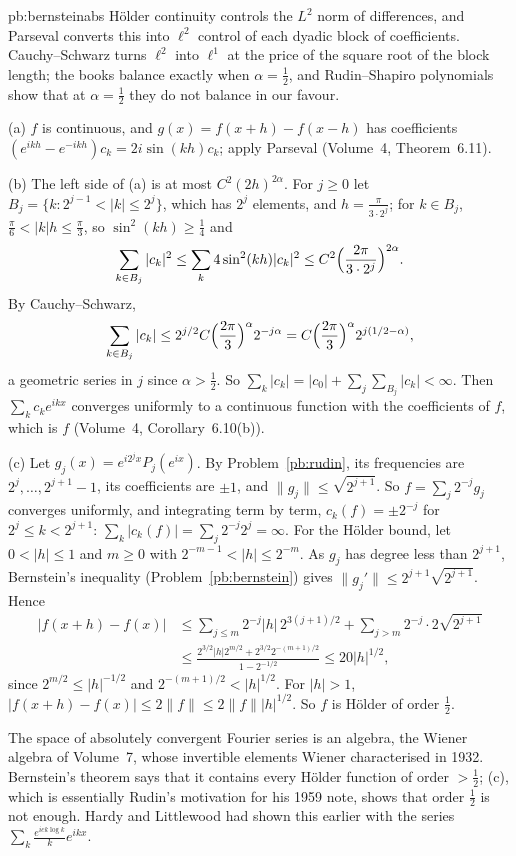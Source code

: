 \begin{solution}{pb:bernsteinabs}
\idea Hölder continuity controls the $L^2$ norm of differences, and Parseval converts this into $\ell^2$ control of each dyadic block of
coefficients. Cauchy--Schwarz turns $\ell^2$ into $\ell^1$ at the price of the square root of the block length; the books balance exactly
when $\alpha=\frac12$, and Rudin--Shapiro polynomials show that at $\alpha=\frac12$ they do not balance in our favour.

\writeup (a) $f$ is continuous, and $g(x)=f(x+h)-f(x-h)$ has coefficients $(e^{ikh}-e^{-ikh})c_k=2i\sin(kh)c_k$; apply Parseval (Volume~4, Theorem~6.11).

(b) The left side of (a) is at most $C^2(2h)^{2\alpha}$. For $j\ge0$ let $B_j=\{k:2^{j-1}<|k|\le2^j\}$, which has $2^j$ elements, and $h=\frac\pi{3\cdot2^j}$; for
$k\in B_j$, $\frac\pi6<|k|h\le\frac\pi3$, so $\sin^2(kh)\ge\frac14$ and
\[
\sum_{k\in B_j}|c_k|^2\le\sum_k4\sin^2(kh)|c_k|^2\le C^2\Bigl(\frac{2\pi}{3\cdot2^j}\Bigr)^{2\alpha}.
\]
By Cauchy--Schwarz,
\[
\sum_{k\in B_j}|c_k|\le2^{j/2}C\Bigl(\frac{2\pi}3\Bigr)^\alpha2^{-j\alpha}=C\Bigl(\frac{2\pi}3\Bigr)^\alpha2^{j(1/2-\alpha)},
\]
a geometric series in $j$ since $\alpha>\frac12$. So
$\sum_k|c_k|=|c_0|+\sum_j\sum_{B_j}|c_k|<\infty$. Then $\sum_kc_ke^{ikx}$ converges uniformly to a continuous function with the coefficients of $f$, which is $f$
(Volume~4, Corollary~6.10(b)).

(c) Let $g_j(x)=e^{i2^jx}P_j(e^{ix})$. By Problem~\ref{pb:rudin}, its frequencies are $2^j,\dots,2^{j+1}-1$, its coefficients are $\pm1$, and $\|g_j\|\le\sqrt{2^{j+1}}$. So
$f=\sum_j2^{-j}g_j$ converges uniformly, and integrating term by term, $c_k(f)=\pm2^{-j}$ for $2^j\le k<2^{j+1}$: $\sum_k|c_k(f)|=\sum_j2^{-j}2^j=\infty$. For the Hölder
bound, let $0<|h|\le1$ and $m\ge0$ with $2^{-m-1}<|h|\le2^{-m}$. As $g_j$ has degree less than $2^{j+1}$, Bernstein's inequality (Problem~\ref{pb:bernstein})
gives $\|g_j'\|\le2^{j+1}\sqrt{2^{j+1}}$. Hence
\[
\begin{aligned}|f(x+h)-f(x)|&\le\sum_{j\le m}2^{-j}|h|\,2^{3(j+1)/2}+\sum_{j>m}2^{-j}\cdot2\sqrt{2^{j+1}}\\&\le\frac{2^{3/2}|h|2^{m/2}+2^{3/2}2^{-(m+1)/2}}{1-2^{-1/2}}\le20|h|^{1/2},\end{aligned}
\]
since $2^{m/2}\le|h|^{-1/2}$ and $2^{-(m+1)/2}<|h|^{1/2}$. For $|h|>1$, $|f(x+h)-f(x)|\le2\|f\|\le2\|f\||h|^{1/2}$. So $f$ is Hölder of order $\frac12$.

\leads The space of absolutely convergent Fourier series is an algebra, the Wiener algebra of Volume~7, whose invertible elements Wiener
characterised in 1932. Bernstein's theorem says that it contains every Hölder function of order $>\frac12$; (c), which is essentially
Rudin's motivation for his 1959 note, shows that order $\frac12$ is not enough. Hardy and Littlewood had shown this earlier with the series
$\sum_k\frac{e^{ick\log k}}ke^{ikx}$.
\end{solution}

